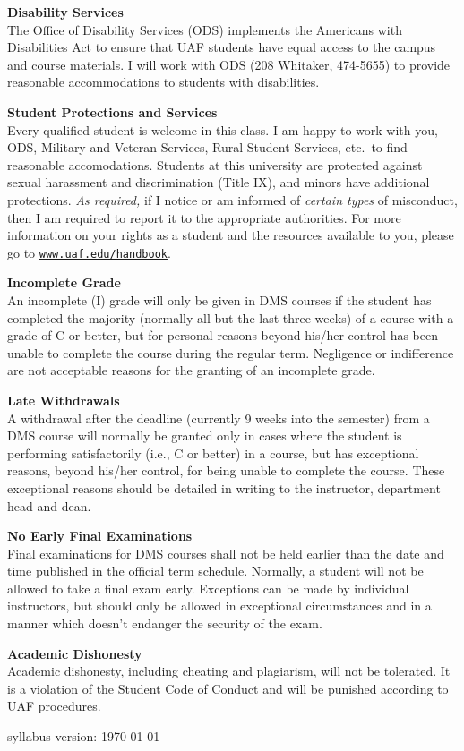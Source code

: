 \documentclass[12pt]{article}
\renewcommand{\emph}[1]{\textsf{\textbf{#1}}}
\newcommand{\localhead}[1]{\par\smallskip\textbf{#1}\nobreak\\}%
\def\heading#1{\localhead{\large\emph{#1}}}
\def\subheading#1{\localhead{\emph{#1}}}
\begin{document}
\subheading{Disability Services}
The Office of Disability Services (ODS) implements the Americans with Disabilities Act to ensure that UAF students have equal access to the campus and course materials.  I will work with ODS (208 Whitaker, 474-5655) to provide reasonable accommodations to students with disabilities.

\subheading{Student Protections and Services}
Every qualified student is welcome in this class.  I am happy to work with you, ODS, Military and Veteran Services, Rural Student Services, etc.~to find reasonable accomodations.  Students at this university are protected against sexual harassment and discrimination (Title IX), and minors have additional protections. \textit{As required,} if I notice or am informed of \textit{certain types} of misconduct, then I am required to report it to the appropriate authorities.  For more information on your rights as a student and the resources available to you, please go to \href{https://www.uaf.edu/handbook/}{\texttt{www.uaf.edu/handbook}}.

\subheading{Incomplete Grade} 
An incomplete (I) grade will only be given in DMS courses if the student has completed the majority (normally all but the last three weeks) of a course with a grade of C or better, but for personal reasons beyond his/her control has been unable to complete the course during the regular term. Negligence or indifference are not acceptable reasons for the granting of an incomplete grade. 

\subheading{Late Withdrawals} 
A withdrawal after the deadline (currently 9 weeks into the semester) from a DMS course will normally be granted only in cases where the student is performing satisfactorily (i.e., C or better) in a course, but has exceptional reasons, beyond his/her control, for being unable to complete the course. These exceptional reasons should be detailed in writing to the instructor, department head and dean.

\subheading{No Early Final Examinations}
Final examinations for DMS courses shall not be held earlier than the date and time published in the official term schedule. Normally, a student will not be allowed to take a final exam early. Exceptions can be made by individual instructors, but should only be allowed in exceptional circumstances and in a manner which doesn't endanger the security of the exam.

\subheading{Academic Dishonesty}
Academic dishonesty, including cheating and plagiarism, will not be tolerated.  It is a violation of the Student Code of Conduct and will be punished according to UAF procedures.

\vfill
\hfill \scriptsize syllabus version: \today \normalsize

\end{document}
